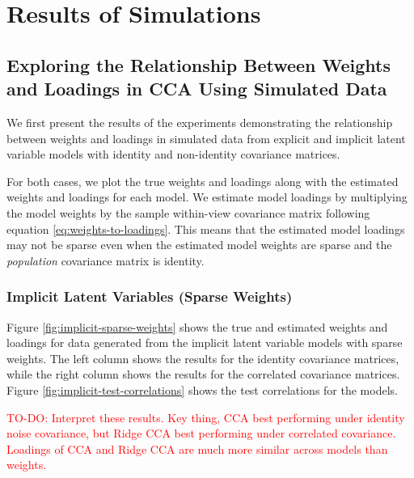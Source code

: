 \section{Results of Simulations}

\subsection{Exploring the Relationship Between Weights and Loadings in CCA Using Simulated Data}

We first present the results of the experiments demonstrating the relationship between weights and \gls{loadings} in simulated data from explicit and implicit latent variable models with identity and non-identity covariance matrices.

For both cases, we plot the true weights and loadings along with the estimated weights and loadings for each model.
We estimate model loadings by multiplying the model weights by the sample within-view covariance matrix following equation \ref{eq:weights-to-loadings}.
This means that the estimated model loadings may not be sparse even when the estimated model weights are sparse and the \textit{population} covariance matrix is identity.

\subsubsection{Implicit Latent Variables (Sparse Weights)}

Figure \ref{fig:implicit-sparse-weights} shows the true and estimated weights and \gls{loadings} for data generated from the implicit latent variable models with sparse weights.
The left column shows the results for the identity covariance matrices, while the right column shows the results for the correlated covariance matrices.
Figure \ref{fig:implicit-test-correlations} shows the test correlations for the models.

\textcolor{red}{TO-DO: Interpret these results. Key thing, CCA best performing under identity noise covariance, but Ridge CCA best performing under correlated covariance. Loadings of CCA and Ridge CCA are much more similar across models than weights.}


